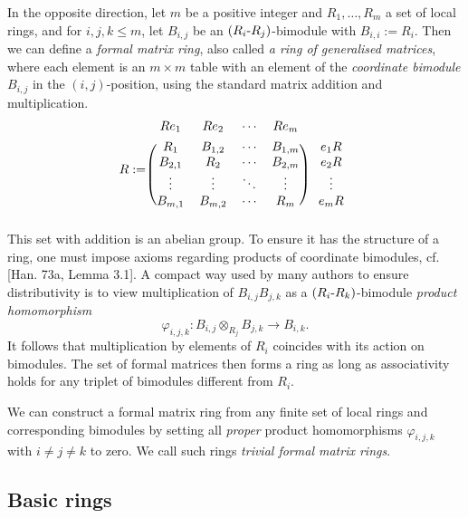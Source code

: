 \documentclass[11pt]{article}
\theoremstyle{plain}
\theoremstyle{remark}
\theoremstyle{plain}
\begin{document}
In the opposite direction, let $m$ be a positive integer and $R_1,\dots, R_m$ a set of local rings, and for $i, j, k\leq m$, let $B_{i,j}$ be an $(R_i\text-R_j)$-bimodule with $B_{i,i}:=R_i$. Then we can define a \textit{formal matrix ring}, also called \textit{a ring of generalised matrices}, where each element is an $m\times m$ table with an element of the \textit{coordinate bimodule} $B_{i,j}$ in the $(i, j)$-position, using the standard matrix addition and multiplication. 
\[
R:=\begin{blockarray}{ccccc} %
    Re_1 & Re_2 & \cdots & Re_m \\[1ex]
    \begin{block}{(cccc)c}
        R_1 & B_{1,2} & \cdots & B_{1,m} & ~ e_1R \\
        B_{2,1} & R_2 & \cdots & B_{2,m} & ~ e_2R \\
        \vdots & \vdots & \ddots & \vdots & ~ \vdots \\
        B_{m,1} & B_{m,2} & \cdots & R_m & ~ e_mR \\
    \end{block}
\end{blockarray}
\]
This set with addition is an abelian group. To ensure it has the structure of a ring, one must impose axioms regarding products of coordinate bimodules, cf. [Han. 73a, Lemma 3.1]. A compact way used by many authors to ensure distributivity is to view multiplication of $B_{i,j}B_{j,k}$ as a $(R_i\text-R_k)$-bimodule \textit{product homomorphism} \[\varphi_{i,j,k}\colon B_{i,j}\otimes_{R_j} B_{j,k} \to B_{i,k}. \] It follows that multiplication by elements of $R_i$ coincides with its action on bimodules. The set of formal matrices then forms a ring as long as associativity holds for any triplet of bimodules different from $R_i$.

We can construct a formal matrix ring from any finite set of local rings and corresponding bimodules by setting all \textit{proper} product homomorphisms $\varphi_{i,j,k}$ with $i\neq j \neq k$ to zero. We call such rings \textit{trivial formal matrix rings}.


\subsection{Basic rings}\label{Secsempbasic}
\end{document}
